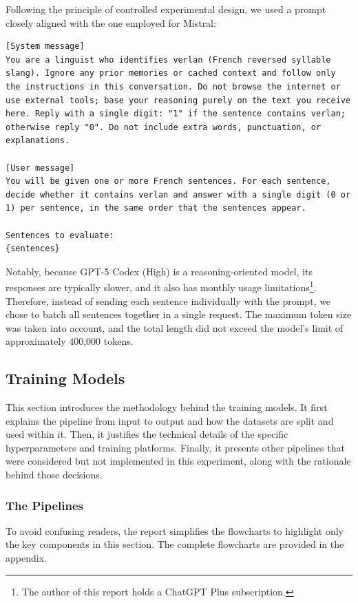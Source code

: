 \documentclass[12pt]{article}
\begin{document}
Following the principle of controlled experimental design, we used a prompt closely aligned with the one employed for Mistral:

\begin{lstlisting}
[System message]
You are a linguist who identifies verlan (French reversed syllable slang). Ignore any prior memories or cached context and follow only the instructions in this conversation. Do not browse the internet or use external tools; base your reasoning purely on the text you receive here. Reply with a single digit: "1" if the sentence contains verlan; otherwise reply "0". Do not include extra words, punctuation, or explanations.

[User message]
You will be given one or more French sentences. For each sentence, decide whether it contains verlan and answer with a single digit (0 or 1) per sentence, in the same order that the sentences appear.

Sentences to evaluate:
{sentences}
\end{lstlisting}

Notably, because GPT-5 Codex (High) is a reasoning-oriented model, its responses are typically slower, and it also has monthly usage limitations\footnote{The author of this report holds a ChatGPT Plus subscription.}. Therefore, instead of sending each sentence individually with the prompt, we chose to batch all sentences together in a single request. The maximum token size was taken into account, and the total length did not exceed the model's limit of approximately 400,000 tokens.

\subsection{Training Models}
This section introduces the methodology behind the training models. It first explains the pipeline from input to output and how the datasets are split and used within it. Then, it justifies the technical details of the specific hyperparameters and training platforms. Finally, it presents other pipelines that were considered but not implemented in this experiment, along with the rationale behind those decisions.

\subsubsection{The Pipelines}
To avoid confusing readers, the report simplifies the flowcharts to highlight only the key components in this section. The complete flowcharts are provided in the appendix.
\end{document}

